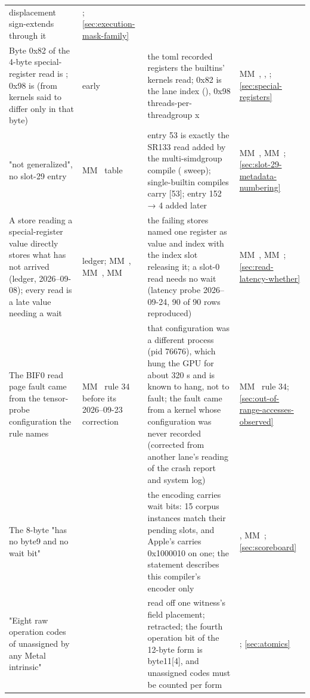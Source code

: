 \begin{xltabular}{\linewidth}{@{}>{\hsize}X>{\hsize}X>{\hsize}X>{\hsize}X@{}}
displacement sign-extends through it & ; \cref{sec:execution-mask-family} \\
Byte 0x82 of the 4-byte special-register read is
; 0x98 is
 (from kernels said to differ only in
that byte) & early  & the toml recorded registers the builtins' kernels read;
0x82 is the lane index (), 0x98 threads-per-threadgroup x & MM~, ,
; \cref{sec:special-registers} \\
 "not generalized", no slot-29 entry & MM~ table & entry 53 is exactly the SR133 read added by the multi-simdgroup compile
( sweep); single-builtin compiles carry
{[}53{]}; entry 152 → 4 added later & MM~, MM~; 
\cref{sec:slot-29-metadata-numbering} \\
A store reading a special-register value directly stores what has not
arrived (ledger, 2026–09-08); every read is a late value needing a wait & ledger; MM~, MM~, MM~ & the failing stores named one register as value and index with the index
slot releasing it; a slot-0 read needs no wait (latency probe
2026–09-24, 90 of 90 rows reproduced) & MM~, MM~; \cref{sec:read-latency-whether} \\
The BIF0 read page fault came from the tensor-probe configuration the
rule names & MM~ rule 34 before its 2026–09-23 correction & that configuration was a different process (pid 76676), which hung the
GPU for about 320 s and is known to hang, not to fault; the fault came
from a  kernel whose configuration was never
recorded (corrected from another lane's reading of the
crash report and system log) & MM~ rule 34; \cref{sec:out-of-range-accesses-observed} \\
The 8-byte  "has no byte9 and no wait
bit" &  & the encoding carries wait bits: 15 corpus instances match their pending
slots, and Apple's  carries 0x1000010
on one; the statement describes this compiler's encoder
only & , MM~; 
\cref{sec:scoreboard} \\
"Eight raw operation codes of  unassigned by any Metal intrinsic" &  & read off one witness's field placement; retracted; the
fourth operation bit of the 12-byte form is byte11{[}4{]}, and
unassigned codes must be counted per form & ; \cref{sec:atomics} \\
\bottomrule
\end{xltabular}

